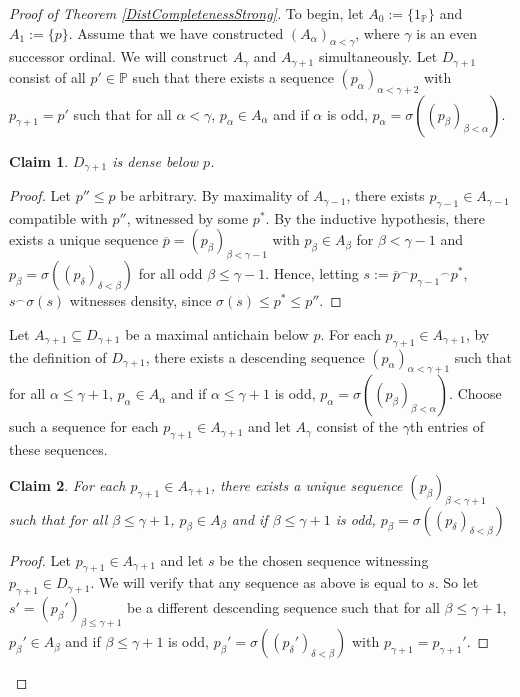 \documentclass[12pt]{amsart}
\theoremstyle{definition}
\theoremstyle{remark}
\theoremstyle{plain}
\newtheorem{myclaim}{Claim}
\numberwithin{mydef}{section}
\newcommand{\dP}{\mathbb{P}}
\begin{document}
\begin{proof}[Proof of Theorem \ref{DistCompletenessStrong}]
		To begin, let $A_0:=\{1_{\dP}\}$ and $A_1:=\{p\}$. Assume that we have constructed $(A_{\alpha})_{\alpha<\gamma}$, where $\gamma$ is an even successor ordinal. We will construct $A_{\gamma}$ and $A_{\gamma+1}$ simultaneously. Let $D_{\gamma+1}$ consist of all $p'\in\dP$ such that there exists a sequence $(p_{\alpha})_{\alpha<\gamma+2}$ with $p_{\gamma+1}=p'$ such that for all $\alpha<\gamma$, $p_{\alpha}\in A_{\alpha}$ and if $\alpha$ is odd, $p_{\alpha}=\sigma((p_{\beta})_{\beta<\alpha})$.
		\setcounter{myclaim}{0}
		\begin{myclaim}
			$D_{\gamma+1}$ is dense below $p$.
		\end{myclaim}
		\begin{proof}
			Let $p''\leq p$ be arbitrary. By maximality of $A_{\gamma-1}$, there exists $p_{\gamma-1}\in A_{\gamma-1}$ compatible with $p''$, witnessed by some $p^*$. By the inductive hypothesis, there exists a unique sequence $\overline{p}=(p_{\beta})_{\beta<\gamma-1}$ with $p_{\beta}\in A_{\beta}$ for $\beta<\gamma-1$ and $p_{\beta}=\sigma((p_{\delta})_{\delta<\beta})$ for all odd $\beta\leq\gamma-1$. Hence, letting $s:=\overline{p}^{\frown}p_{\gamma-1}{}^{\frown}p^*$, $s^{\frown}\sigma(s)$ witnesses density, since $\sigma(s)\leq p^*\leq p''$.
		\end{proof}
		Let $A_{\gamma+1}\subseteq D_{\gamma+1}$ be a maximal antichain below $p$. For each $p_{\gamma+1}\in A_{\gamma+1}$, by the definition of $D_{\gamma+1}$, there exists a descending sequence $(p_{\alpha})_{\alpha<\gamma+1}$ such that for all $\alpha\leq\gamma+1$, $p_{\alpha}\in A_{\alpha}$ and if $\alpha\leq\gamma+1$ is odd, $p_{\alpha}=\sigma((p_{\beta})_{\beta<\alpha})$. Choose such a sequence for each $p_{\gamma+1}\in A_{\gamma+1}$ and let $A_{\gamma}$ consist of the $\gamma$th entries of these sequences.
		\begin{myclaim}
			For each $p_{\gamma+1}\in A_{\gamma+1}$, there exists a unique sequence $(p_{\beta})_{\beta<\gamma+1}$ such that for all $\beta\leq\gamma+1$, $p_{\beta}\in A_{\beta}$ and if $\beta\leq\gamma+1$ is odd, $p_{\beta}=\sigma((p_{\delta})_{\delta<\beta})$
		\end{myclaim}
		\begin{proof}
			Let $p_{\gamma+1}\in A_{\gamma+1}$ and let $s$ be the chosen sequence witnessing $p_{\gamma+1}\in D_{\gamma+1}$. We will verify that any sequence as above is equal to $s$. So let $s'=(p_{\beta}')_{\beta\leq\gamma+1}$ be a different descending sequence such that for all $\beta\leq\gamma+1$, $p_{\beta}'\in A_{\beta}$ and if $\beta\leq\gamma+1$ is odd, $p_{\beta}'=\sigma((p_{\delta}')_{\delta<\beta})$ with $p_{\gamma+1}=p_{\gamma+1}'$.
			

\end{proof}
\end{proof}
\end{document}
